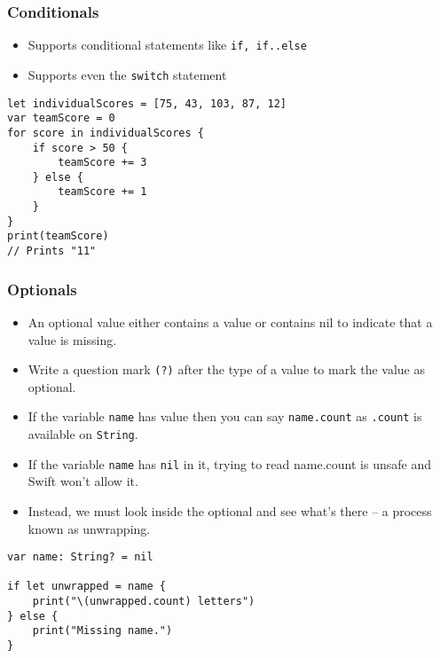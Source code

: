 \begin{frame}[fragile] \frametitle{Conditionals}

\begin{itemize}
\item Supports conditional statements like \lstinline|if, if..else|
\item Supports even the \lstinline|switch| statement
\end{itemize}

\begin{lstlisting}
let individualScores = [75, 43, 103, 87, 12]
var teamScore = 0
for score in individualScores {
    if score > 50 {
        teamScore += 3
    } else {
        teamScore += 1
    }
}
print(teamScore)
// Prints "11"
\end{lstlisting}
\end{frame}

\begin{frame}[fragile] \frametitle{Optionals}

\begin{itemize}
\item An optional value either contains a value or contains nil to indicate that a value is missing. 
\item Write a question mark \lstinline|(?)| after the type of a value to mark the value as optional.
\item If the variable \lstinline|name| has value then you can say \lstinline|name.count| as \lstinline|.count| is available on \lstinline|String|.
\item If the variable \lstinline|name| has \lstinline|nil| in it, trying to read name.count is unsafe and Swift won’t allow it. 
\item Instead, we must look inside the optional and see what’s there – a process known as unwrapping.
\end{itemize}

\begin{lstlisting}
var name: String? = nil

if let unwrapped = name {
    print("\(unwrapped.count) letters")
} else {
    print("Missing name.")
}
\end{lstlisting}

\end{frame}


